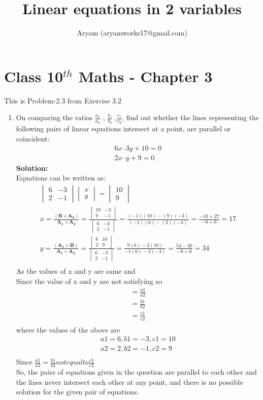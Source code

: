 \documentclass[10pt]{article}
\title{Linear equations in 2 variables}
\author{Aryam (aryamworks17@gmail.com)}
\newcommand{\mydet}[1]{\ensuremath{\begin{vmatrix}#1\end{vmatrix}}}
\newcommand{\solution}{\noindent \textbf{Solution: }}
\providecommand{\brak}[1]{\ensuremath{\left(#1\right)}}
\let\vec\mathbf
\begin{document}
\maketitle
\section*{Class 10$^{th}$ Maths - Chapter 3}
This is Problem-2.3 from Exercise 3.2
\begin{enumerate}
\item On comparing the ratios $\frac{a_1}{a_2}$ , $\frac{b_1}{b_2}$ ,$\frac{c_1}{c_2}$, find out whether the lines representing the following pairs of linear equations intersect at a point, are parallel or coincident:\\
\begin{align}
6x–3y +10=0\\
2x–y+9=0
\end{align}
\solution \\
Equations can be written as:\\
\begin{align}
\mydet{6&-3\\2&-1} \mydet{x\\y}= \mydet{10\\9}\\
 x= \frac{\brak{\vec{B}\times \vec{A_2}}}{\vec{A_1\times A_2}}
=\frac{\mydet{10&-3\\9&-1}}{\mydet{6&-3\\2&-1}}
=\frac{{(-1)(10) - (9)(-3)}}{{(-1)(6) - (2)(-3)}}
=\frac{-10+27}{-6+6}
=17\\
 y= \frac{\brak{\vec{A_1}\times \vec{B}}}{\vec{A_1\times A_2}}
=\frac{\mydet{6&10\\2&9}}{\mydet{6&-3\\2&-1}}
=\frac{9(6) - 2(10)}{-1(6) -2(-3)}
=\frac{54-20}{-6+6}
=34\\
\end{align}
As the values of x and y are same and\\
Since the value of x and y are not satisfying so\\
\begin{align}
=\frac{a1}{a2}\\
=\frac{b1}{b2}\\
=\frac{c1}{c2}\\
\end{align}
where the values of the above are\\
\begin{align}
a1 = 6, b1 = -3, c1 = 10\\
a2 = 2, b2 = -1, c2 = 9\\
\end{align}
Since $\frac{a1}{a2}    =     \frac{b1}{b2} not    equal    to    \frac{c1}{c2}$ \\

So, the pairs of equations given in the question are parallel to each other and the lines never intersect each other at any point, and there is no possible solution for the given pair of equations.\\
\end{enumerate}
\end{document}
